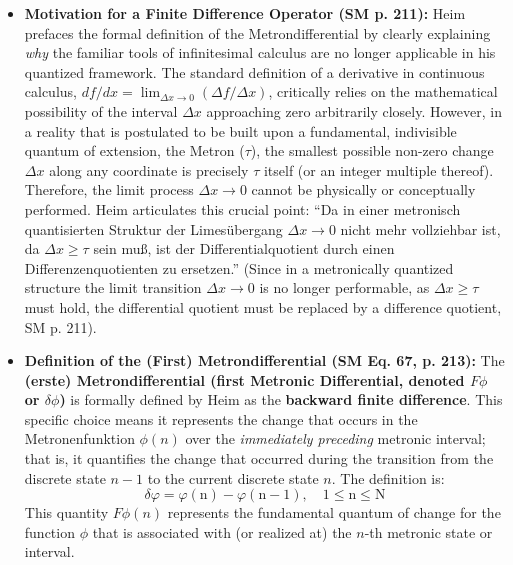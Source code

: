 \documentclass[12pt]{article}
\newcommand{\q}[1]{\enquote{#1}}
\newcommand{\metron}{\tau}
\newcommand{\metrondifferential}{F} %
\newcommand{\metronenziffer}{n}
\begin{document}
\begin{itemize}
    \item \textbf{Motivation for a Finite Difference Operator (SM p. 211):}
    Heim prefaces the formal definition of the Metrondifferential by clearly explaining \textit{why} the familiar tools of infinitesimal calculus are no longer applicable in his quantized framework. The standard definition of a derivative in continuous calculus, \( df/dx = \lim_{\Delta x\to 0} (\Delta f/\Delta x) \), critically relies on the mathematical possibility of the interval \( \Delta x \) approaching zero arbitrarily closely. However, in a reality that is postulated to be built upon a fundamental, indivisible quantum of extension, the Metron (\( \metron \)), the smallest possible non-zero change \( \Delta x \) along any coordinate is precisely \( \metron \) itself (or an integer multiple thereof). Therefore, the limit process \( \Delta x \to 0 \) cannot be physically or conceptually performed. Heim articulates this crucial point: \q{Da in einer metronisch quantisierten Struktur der Limesübergang \( \Delta x \to 0 \) nicht mehr vollziehbar ist, da \( \Delta x \geq \tau \) sein muß, ist der Differentialquotient durch einen Differenzenquotienten zu ersetzen.} (Since in a metronically quantized structure the limit transition \( \Delta x \to 0 \) is no longer performable, as \( \Delta x \geq \tau \) must hold, the differential quotient must be replaced by a difference quotient, SM p. 211).

    \item \textbf{Definition of the (First) Metrondifferential (SM Eq. 67, p. 213):}
    The \textbf{(erste) Metrondifferential (first Metronic Differential, denoted \( \metrondifferential\phi \) or \( \delta\phi \))} is formally defined by Heim as the \textbf{backward finite difference}. This specific choice means it represents the change that occurs in the Metronenfunktion \( \phi(\metronenziffer) \) over the \textit{immediately preceding} metronic interval; that is, it quantifies the change that occurred during the transition from the discrete state \( \metronenziffer-1 \) to the current discrete state \( \metronenziffer \). The definition is:
    \begin{equation}
    \delta\varphi = \varphi(\mathrm{n}) - \varphi(\mathrm{n}-1), \quad 1 \le \mathrm{n} \le \mathrm{N} \tag{67}
    \label{eq:original_first_metrondifferential}
    \end{equation}
    This quantity \( \metrondifferential\phi(\metronenziffer) \) represents the fundamental quantum of change for the function \( \phi \) that is associated with (or realized at) the \( \metronenziffer \)-th metronic state or interval.


\end{itemize}
\end{document}
